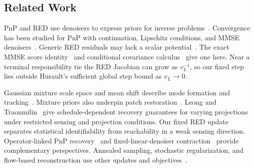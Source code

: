 \subsection{Related Work}
PnP and RED use denoisers to express priors for inverse
problems~\cite{venkatakrishnan2013,romano2017,kamilov2023}.
Convergence has been studied for PnP with continuation, Lipschitz
conditions, and MMSE denoisers~\cite{chan2017,ryu2019,xu2020}.
Generic RED residuals may lack a scalar potential~\cite{reehorst2019}.
The exact MMSE score identity~\cite{efron2011} and conditional
covariance calculus~\cite{dytso2023} give one here.
Near a terminal responsibility tie the RED Jacobian can grow as
$v_L^{-1}$, so our fixed step lies outside Hurault's sufficient
global step bound as $v_L\to0$.

Gaussian mixture scale space and mean shift describe mode formation
and tracking~\cite{carreira2003,carreira2007,carreira2015}.
Mixture priors also underpin patch restoration~\cite{zoran2011,yu2012}.
Leong and Traonmilin~\cite{leong2026} give schedule-dependent
recovery guarantees for varying projections under restricted
sensing and projection conditions. Our fixed RED update separates
statistical identifiability from reachability in a weak sensing
direction. Operator-linked PnP recovery~\cite{wolf2026} and
fixed-linear-denoiser contraction~\cite{sinha2025} provide
complementary perspectives. Annealed sampling, stochastic
regularization, and flow-based reconstruction use other updates
and objectives~\cite{song2019,kadkhodaie2021,laumont2022,renaud2024,martin2025}.
